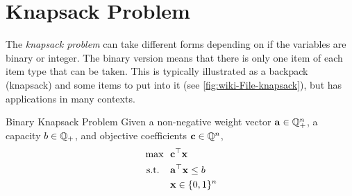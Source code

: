 \section{Knapsack Problem}
The \emph{knapsack problem} can take different forms depending on if the variables are binary or integer.  The binary version means that there is only one item of each item type that can be taken.  This is typically illustrated as a backpack (knapsack) and some items to put into it (see  \autoref{fig:wiki-File-knapsack}), but has applications in many contexts.  




\begin{general}{Binary Knapsack Problem}{\npcomplete}
Given a non-negative weight vector $\mathbf{a} \in \mathbb{Q}^n_+$, a capacity $b \in \mathbb{Q}_+$, and objective coefficients $\mathbf{c} \in \mathbb{Q}^n$, 
\begin{equation}
\begin{split}
\max \ \ & \mathbf{c}^\top \mathbf{x}\\
\text{ s.t. } \ \ & \mathbf{a}^\top \mathbf{x} \leq b\\
& \mathbf{x} \in \{0,1\}^n
\end{split}
\end{equation}
\end{general}
 


 

